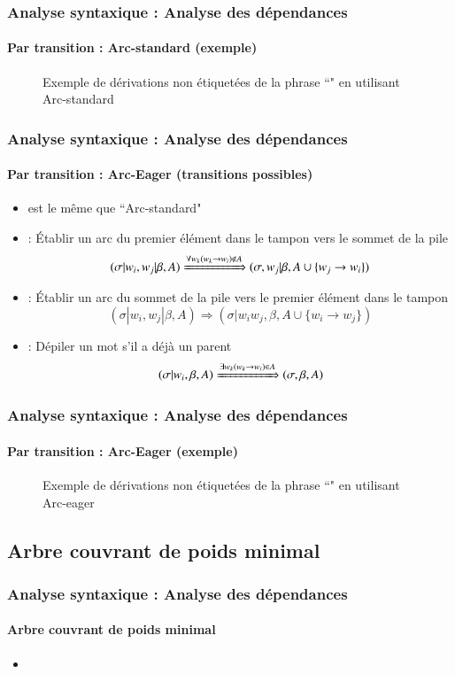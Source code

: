 \documentclass[xcolor=table]{beamer}
\begin{document}
\begin{frame}
\frametitle{Analyse syntaxique : Analyse des dépendances}
\framesubtitle{Par transition : Arc-standard (exemple)}

\begin{figure}
	\caption{Exemple de dérivations non étiquetées de la phrase ``" en utilisant Arc-standard \cite{2018-eisenstein}}
\end{figure}

\end{frame}


\begin{frame}
\frametitle{Analyse syntaxique : Analyse des dépendances}
\framesubtitle{Par transition : Arc-Eager (transitions possibles)}

\begin{itemize}
	\item {} est le même que ``Arc-standard"
	
	\item {} : Établir un arc du premier élément dans le tampon vers le sommet de la pile
	\[ (\sigma|w_i, w_j|\beta, A) \xRightarrow{\forall w_k (w_k \rightarrow w_i) \notin A}  (\sigma, w_j|\beta, A \cup \{w_j \rightarrow w_i \}) \] 
	
	\item {} : Établir un arc du sommet de la pile vers le premier élément dans le tampon
	\[ (\sigma|w_i, w_j|\beta, A) \Rightarrow  (\sigma|w_i w_j, \beta, A \cup \{w_i \rightarrow w_j \}) \] 
	
	\item {} : Dépiler un mot s'il a déjà un parent
	\[ (\sigma|w_i, \beta, A) \xRightarrow{\exists w_k (w_k \rightarrow w_i) \in A} (\sigma, \beta, A) \] 
\end{itemize}

\end{frame}

\begin{frame}
\frametitle{Analyse syntaxique : Analyse des dépendances}
\framesubtitle{Par transition : Arc-Eager (exemple)}

\begin{figure}
	\caption{Exemple de dérivations non étiquetées de la phrase ``" en utilisant Arc-eager \cite{2018-eisenstein}}
\end{figure}

\end{frame}

\subsection{Arbre couvrant de poids minimal}

\begin{frame}
\frametitle{Analyse syntaxique : Analyse des dépendances}
\framesubtitle{Arbre couvrant de poids minimal}

\begin{itemize}
	\item 
\end{itemize}

\end{frame}

\end{document}
